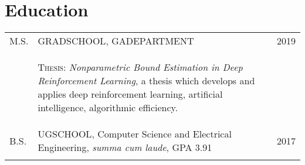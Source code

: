 \documentclass[a4paper,10pt]{article}
\begin{document}
\section{Education}
\begin{supertabular}{p{1.5cm}p{13.9cm}>{\raggedleft\arraybackslash}p{1.5cm}}
	\textsc{M.S.} & \textsc{GRADSCHOOL}, \small GADEPARTMENT
	& 	\textsc{2019} \\
	& \begin{enumerate*}[label =$\circ$, itemjoin={\newline}]
	\item \footnotesize \textsc{Thesis:} \emph{Nonparametric Bound Estimation in Deep Reinforcement Learning}, a thesis which develops and applies deep reinforcement learning, artificial intelligence, algorithmic efficiency.
	\end{enumerate*}
	& \\
	\textsc{B.S.} & \textsc{UGSCHOOL}, \small Computer Science and Electrical Engineering, \emph{summa cum laude}, GPA 3.91
	&	\textsc{2017} 	\\
	 \\
\end{supertabular}



\end{document}
